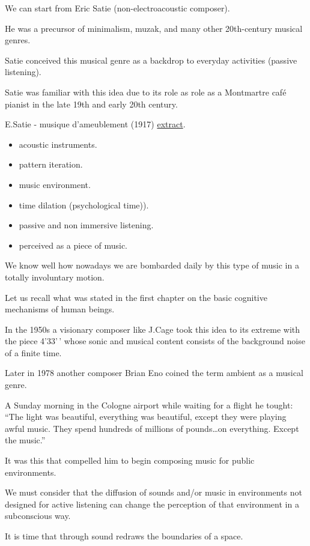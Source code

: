 We can start from Eric Satie (non-electroacoustic composer).

He was a precursor of minimalism, muzak, and many other 20th-century musical genres.

Satie conceived this musical genre as a backdrop to everyday activities (passive listening).

Satie was familiar with this idea due to its role as role as a Montmartre café pianist in the late 19th and early 20th century.

E.Satie - musique d'ameublement (1917) \href{https://github.com/musicaecodice/EMC/blob/main/2_instruments/suoni/satie%20.mp3}{extract}.

\begin{itemize}
\tightlist
\item acoustic instruments.
\item pattern iteration.
\item music environment.
\item time dilation (psychological time)).
\item passive and non immersive listening.
\item perceived as a piece of music.
\end{itemize}

We know well how nowadays we are bombarded daily by this type of music in a totally involuntary motion.

Let us recall what was stated in the first chapter on the basic cognitive mechanisms of human beings.

In the 1950s a visionary composer like J.Cage took this idea to its extreme with the piece 4'33'\,' whose sonic and musical content consists of the background noise of a finite time.

Later in 1978 another composer Brian Eno coined the term ambient as a musical genre.

A Sunday morning in the Cologne airport while waiting for a flight he tought: ``The light was beautiful, everything was beautiful, except they were playing awful music. They spend hundreds of millions of pounds\ldots on everything. Except the music.''

It was this that compelled him to begin composing music for public environments.

We must consider that the diffusion of sounds and/or music in environments not designed for active listening can change the perception of that environment in a subconscious way.

It is time that through sound redraws the boundaries of a space.

